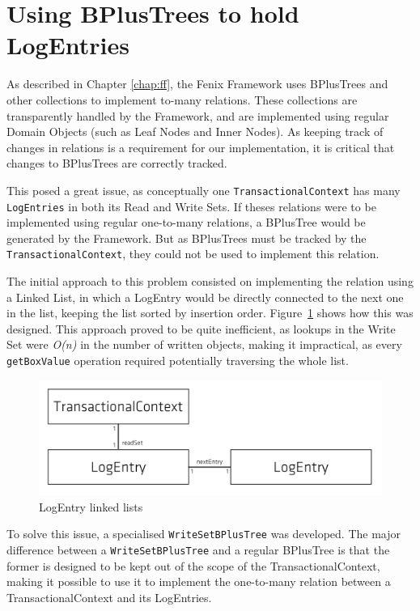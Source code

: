 \section{Using BPlusTrees to hold LogEntries}

As described in Chapter \ref{chap:ff}, the Fenix Framework uses
BPlusTrees and other collections to implement to-many relations. These
collections are transparently handled by the Framework, and are
implemented using regular Domain Objects (such as Leaf Nodes and Inner
Nodes). As keeping track of changes in relations is a requirement for
our implementation, it is critical that changes to BPlusTrees are
correctly tracked.

This posed a great issue, as conceptually one
\texttt{TransactionalContext} has many \texttt{LogEntries} in both its
Read and Write Sets. If theses relations were to be implemented using
regular one-to-many relations, a BPlusTree would be generated by the
Framework. But as BPlusTrees must be tracked by the
\texttt{TransactionalContext}, they could not be used to implement
this relation.

The initial approach to this problem consisted on implementing the
relation using a Linked List, in which a LogEntry would be directly
connected to the next one in the list, keeping the list sorted by
insertion order. Figure~\ref{fig:linkedList} shows how this was
designed. This approach proved to be quite inefficient, as lookups in
the Write Set were {\it O(n)} in the number of written objects, making
it impractical, as every \texttt{getBoxValue} operation required
potentially traversing the whole list.

\begin{figure}
\centering
\includegraphics[width=0.7\linewidth]{tx-context-v1}
\caption{LogEntry linked lists}
\label{fig:linkedList}
\end{figure}

To solve this issue, a specialised \texttt{WriteSetBPlusTree} was
developed. The major difference between a \texttt{WriteSetBPlusTree}
and a regular BPlusTree is that the former is designed to be kept out
of the scope of the TransactionalContext, making it possible to use it
to implement the one-to-many relation between a TransactionalContext
and its LogEntries.

